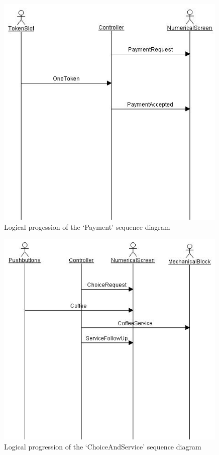 \documentclass[12pt]{article}
\begin{document}
\begin{figure}[htbp]
\centering
\includegraphics[width=0.99\textwidth]{fig/paymentseqdiagram.jpg}
\caption{Logical progession of the `Payment' sequence diagram} \label{fig:paymentseqdiagram}
\end{figure}

\begin{figure}[htbp]
\centering
\includegraphics[width=0.99\textwidth]{fig/choiceseqdiagram.jpg}
\caption{Logical progression of the `ChoiceAndService' sequence diagram} \label{fig:choiceseqdiagram}
\end{figure}
\end{document}
